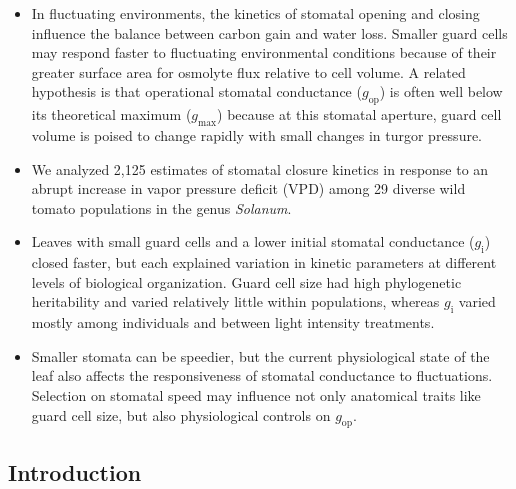 \documentclass[
  letterpaper,
  DIV=11,
  numbers=noendperiod]{scrartcl}
\newcommand{\gi}{$g_\mathrm{i}$}
\newcommand{\gmax}{$g_\mathrm{max}$}
\newcommand{\gop}{$g_\mathrm{op}$}
\begin{document}
\begin{itemize}
\item
  In fluctuating environments, the kinetics of stomatal opening and
  closing influence the balance between carbon gain and water loss.
  Smaller guard cells may respond faster to fluctuating environmental
  conditions because of their greater surface area for osmolyte flux
  relative to cell volume. A related hypothesis is that operational
  stomatal conductance (\gop) is often well below its theoretical
  maximum (\gmax) because at this stomatal aperture, guard cell volume
  is poised to change rapidly with small changes in turgor pressure.
\item
  We analyzed 2,125 estimates of stomatal closure kinetics in response
  to an abrupt increase in vapor pressure deficit (VPD) among 29 diverse
  wild tomato populations in the genus \emph{Solanum}.
\item
  Leaves with small guard cells and a lower initial stomatal conductance
  (\gi) closed faster, but each explained variation in kinetic
  parameters at different levels of biological organization. Guard cell
  size had high phylogenetic heritability and varied relatively little
  within populations, whereas \gi{} varied mostly among individuals and
  between light intensity treatments.
\item
  Smaller stomata can be speedier, but the current physiological state
  of the leaf also affects the responsiveness of stomatal conductance to
  fluctuations. Selection on stomatal speed may influence not only
  anatomical traits like guard cell size, but also physiological
  controls on \gop.
\end{itemize}

\newpage{}

\subsection{Introduction}\label{introduction}
\end{document}
